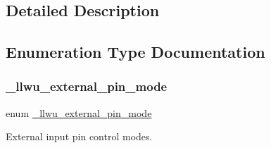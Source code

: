 \subsection{Detailed Description}


\subsection{Enumeration Type Documentation}
\mbox{\label{group__llwu_ga5b7fb066930b9abddc4de2d5431f1f46}} 
\subsubsection{\texorpdfstring{\_llwu\_external\_pin\_mode}{\_llwu\_external\_pin\_mode}}
{\footnotesize\ttfamily enum \mbox{\hyperlink{group__llwu_ga5b7fb066930b9abddc4de2d5431f1f46}{\+\_\+llwu\+\_\+external\+\_\+pin\+\_\+mode}}}



External input pin control modes. 

